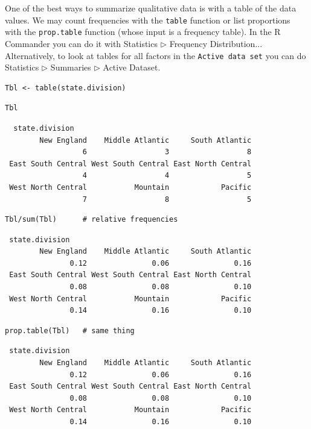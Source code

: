 \documentclass[captions=tableheading]{scrbook}
\begin{document}
One of the best ways to summarize qualitative data is with a table of the data values. We may count frequencies with the \texttt{table} function or list proportions with the \texttt{prop.table} function (whose input is a frequency table). In the \textsf{R} Commander you can do it with \textsf{Statistics} \textsf{\(\triangleright\)} \textsf{Frequency Distribution}... Alternatively, to look at tables for all factors in the \texttt{Active data set} you can do \textsf{Statistics} \textsf{\(\triangleright\)} \textsf{Summaries} \textsf{\(\triangleright\)} \textsf{Active Dataset}.


\begin{verbatim}
Tbl <- table(state.division)
\end{verbatim}


\begin{verbatim}
Tbl
\end{verbatim}

\begin{verbatim}
  state.division
        New England    Middle Atlantic     South Atlantic 
                  6                  3                  8 
 East South Central West South Central East North Central 
                  4                  4                  5 
 West North Central           Mountain            Pacific 
                  7                  8                  5
\end{verbatim}


\begin{verbatim}
Tbl/sum(Tbl)      # relative frequencies
\end{verbatim}

\begin{verbatim}
 state.division
        New England    Middle Atlantic     South Atlantic 
               0.12               0.06               0.16 
 East South Central West South Central East North Central 
               0.08               0.08               0.10 
 West North Central           Mountain            Pacific 
               0.14               0.16               0.10
\end{verbatim}


\begin{verbatim}
prop.table(Tbl)   # same thing
\end{verbatim}

\begin{verbatim}
 state.division
        New England    Middle Atlantic     South Atlantic 
               0.12               0.06               0.16 
 East South Central West South Central East North Central 
               0.08               0.08               0.10 
 West North Central           Mountain            Pacific 
               0.14               0.16               0.10
\end{verbatim}
\end{document}
